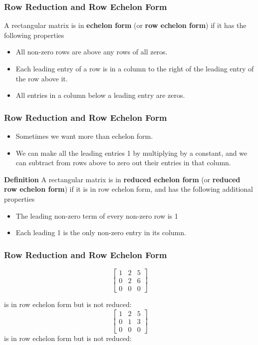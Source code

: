   \begin{frame}[fragile]\frametitle{Row Reduction and Row Echelon Form}
 A rectangular matrix is in \textbf{echelon form}
(or \textbf{row echelon form}) if it has the following properties
\begin{itemize}
 \item All non-zero rows are above any rows of all zeros.
 \item Each leading entry of a row is in a column to the right of the leading
 entry of the row above it.
 \item All entries in a column below a leading entry are zeros.
\end{itemize}

\end{frame}

  \begin{frame}[fragile]\frametitle{Row Reduction and Row Echelon Form}
\begin{itemize}
 \item Sometimes we want more than echelon form. 
 \item  We can make all the leading 
entries 1 by multiplying by a constant, and we can subtract from rows 
above to zero out their entries in that column.
\end{itemize}

\textbf{Definition} A rectangular matrix is in \textbf{reduced echelon form}
(or \textbf{reduced row echelon form}) if it is in row echelon form, and 
 has the following additional properties
\begin{itemize}
 \item The leading non-zero term of every non-zero row is 1
 \item Each leading 1 is the only non-zero entry in its column.
\end{itemize}

\end{frame}

  \begin{frame}[fragile]\frametitle{Row Reduction and Row Echelon Form}
\[
\begin{bmatrix}
 1 & 2 & 5 \\
 0 & 2 & 6 \\
 0 & 0 & 0
\end{bmatrix}
\]

is in row echelon form but is not reduced:
\[
\begin{bmatrix}
 1 & 2 & 5 \\
 0 & 1 & 3 \\
 0 & 0 & 0
\end{bmatrix}
\] 
is in row echelon form but is not reduced:
\end{frame}

